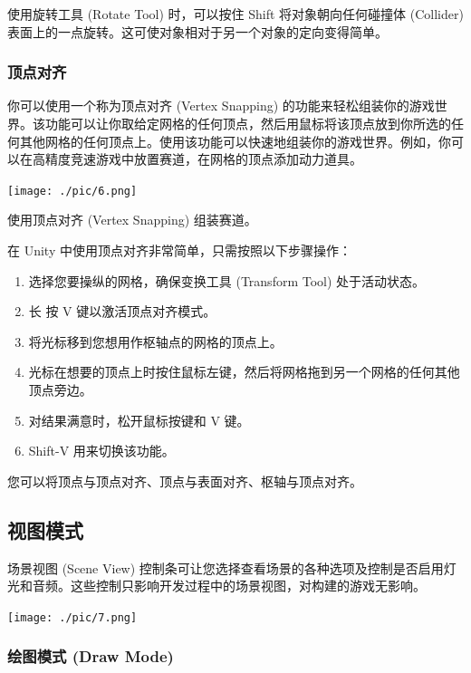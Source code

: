 \documentclass[9pt, b5paper]{article}
\begin{document}
使用旋转工具 (Rotate Tool) 时，可以按住 Shift 将对象朝向任何碰撞体 (Collider) 表面上的一点旋转。这可使对象相对于另一个对象的定向变得简单。

\subsubsection{顶点对齐}
\label{sec:orgc7c2142}

你可以使用一个称为顶点对齐 (Vertex Snapping) 的功能来轻松组装你的游戏世界。该功能可以让你取给定网格的任何顶点，然后用鼠标将该顶点放到你所选的任何其他网格的任何顶点上。使用该功能可以快速地组装你的游戏世界。例如，你可以在高精度竞速游戏中放置赛道，在网格的顶点添加动力道具。

\begin{center}
\texttt{[image: ./pic/6.png]}
\end{center}
使用顶点对齐 (Vertex Snapping) 组装赛道。

在 Unity 中使用顶点对齐非常简单，只需按照以下步骤操作：

\begin{enumerate}
\item 选择您要操纵的网格，确保变换工具 (Transform Tool) 处于活动状态。

\item 长 按 V 键以激活顶点对齐模式。

\item 将光标移到您想用作枢轴点的网格的顶点上。

\item 光标在想要的顶点上时按住鼠标左键，然后将网格拖到另一个网格的任何其他顶点旁边。

\item 对结果满意时，松开鼠标按键和 V 键。

\item Shift-V 用来切换该功能。
\end{enumerate}

您可以将顶点与顶点对齐、顶点与表面对齐、枢轴与顶点对齐。

\subsection{视图模式}
\label{sec:org9c3fbdd}
场景视图 (Scene View) 控制条可让您选择查看场景的各种选项及控制是否启用灯光和音频。这些控制只影响开发过程中的场景视图，对构建的游戏无影响。

\begin{center}
\texttt{[image: ./pic/7.png]}
\end{center}
\subsubsection{绘图模式 (Draw Mode)}
\label{sec:org77d2b5e}
\end{document}
